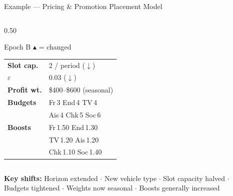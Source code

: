 \documentclass[aspectratio=169,10pt]{beamer}
\begin{document}
\begin{frame}[t]{Example — Pricing \& Promotion Placement Model}
\begin{columns}[T]
\begin{column}{0.50\textwidth}
\begin{block}{\scriptsize Epoch B \quad\textcolor{ared}{\scriptsize$\blacktriangle$ = changed}}
\begin{tabular}{@{}l@{\;\;}l@{}}
        \textbf{Slot cap.}     & \textcolor{ared}{2} / period \textcolor{ared}{\scriptsize($\downarrow$)} \\
        \textbf{$\varepsilon$} & \textcolor{ared}{0.03} \textcolor{ared}{\scriptsize($\downarrow$)} \\
        \textbf{Profit wt.}    & \textcolor{ared}{\$400--\$600 (seasonal)} \\
        \textbf{Budgets}       & Fr\,\textcolor{ared}{3}\; End\,\textcolor{ared}{4}\; TV\,\textcolor{ared}{4} \\
                                & Ais\,\textcolor{ared}{4}\; Chk\,\textcolor{ared}{5}\; \textcolor{ared}{Soc\,6} \\
        \textbf{Boosts}        & Fr\,\textcolor{ared}{1.50}\; End\,\textcolor{ared}{1.30} \\
                                & TV\,\textcolor{ared}{1.20}\; Ais\,\textcolor{ared}{1.20} \\
                                & Chk\,\textcolor{ared}{1.10}\; \textcolor{ared}{Soc\,1.40} \\
      \end{tabular}
    \end{block}
  \end{column}
\end{columns}
\vspace{4pt}
\centering\scriptsize
\textcolor{ared}{\textbf{Key shifts:}}
Horizon extended $\cdot$ New vehicle type $\cdot$ Slot capacity halved $\cdot$
Budgets tightened $\cdot$ Weights now seasonal $\cdot$ Boosts generally increased
\end{frame}
\end{document}
